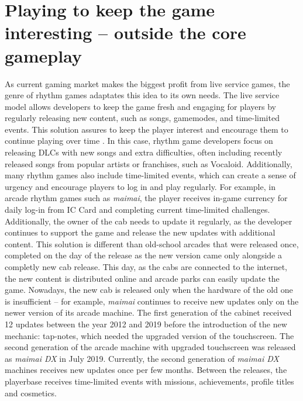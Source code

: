 \section{Playing to keep the game interesting -- outside the core gameplay}
As current gaming market makes the biggest profit from live service games, the genre of rhythm games adaptates this idea to its own needs. The live service model allows developers to keep the game fresh and engaging for players by regularly releasing new content, such as songs, gamemodes, and time-limited events. This solution assures to keep the player interest and encourage them to continue playing over time \cite{liveservice}. In this case, rhythm game developers focus on releasing DLCs with new songs and extra difficulties, often including recently released songs from popular artists or franchises, such as Vocaloid. Additionally, many rhythm games also include time-limited events, which can create a sense of urgency and encourage players to log in and play regularly. For example, in arcade rhythm games such as \textit{maimai}, the player receives in-game currency for daily log-in from IC Card and completing current time-limited challenges. Additionally, the owner of the cab needs to update it regularly, as the developer continues to support the game and release the new updates with additional content. This solution is different than old-school arcades that were released once, completed on the day of the release as the new version came only alongside a completly new cab release. This day, as the cabs are connected to the internet, the new content is distributed online and arcade parks can easily update the game. Nowadays, the new cab is released only when the hardware of the old one is insufficient -- for example, \textit{maimai} continues to receive new updates only on the newer version of its arcade machine. The first generation of the cabinet received 12 updates between the year 2012 and 2019 before the introduction of the new mechanic: tap-notes, which needed the upgraded version of the touchscreen. The second generation of the arcade machine with upgraded touchscreen was released as \textit{maimai DX} in July 2019. Currently, the second generation of \textit{maimai DX} machines receives new updates once per few months. Between the releases, the playerbase receives time-limited events with missions, achievements, profile titles and cosmetics. 

